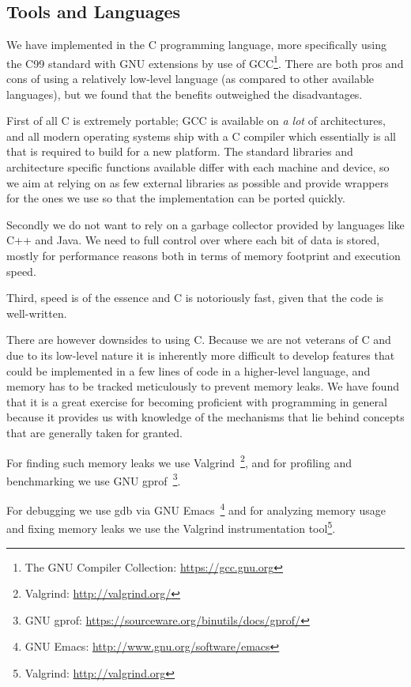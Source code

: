 \subsection{Tools and Languages}

We have implemented \thename{} in the C programming language, more specifically
using the C99 standard with GNU extensions by use of GCC\footnote{The GNU
  Compiler Collection: \url{https://gcc.gnu.org}}. There are both pros and cons
of using a relatively low-level language (as compared to other available
languages), but we found that the benefits outweighed the disadvantages.

First of all C is extremely portable; GCC is available on \textit{a lot} of
architectures, and all modern operating systems ship with a C compiler which
essentially is all that is required to build \thename{} for a new platform. The
standard libraries and architecture specific functions available differ with
each machine and device, so we aim at relying on as few external libraries as
possible and provide wrappers for the ones we use so that the implementation can
be ported quickly.

Secondly we do not want to rely on a garbage collector provided by languages
like C++ and Java. We need to full control over where each bit of data is
stored, mostly for performance reasons both in terms of memory footprint and
execution speed.

Third, speed is of the essence and C is notoriously fast, given that the code is
well-written.

There are however downsides to using C. Because we are not veterans of C and due
to its low-level nature it is inherently more difficult to develop features that
could be implemented in a few lines of code in a higher-level language, and
memory has to be tracked meticulously to prevent memory leaks. We have found
that it is a great exercise for becoming proficient with programming in general
because it provides us with knowledge of the mechanisms that lie behind concepts
that are generally taken for granted.

For finding such memory leaks we use Valgrind~\footnote{Valgrind:
  \url{http://valgrind.org/}}, and for profiling and benchmarking we use GNU
gprof~\footnote{GNU gprof: \url{https://sourceware.org/binutils/docs/gprof/}}.

For debugging we use gdb via GNU Emacs~\footnote{GNU Emacs:
  \url{http://www.gnu.org/software/emacs}} and for analyzing memory usage and
fixing memory leaks we use the Valgrind instrumentation tool\footnote{Valgrind:
  \url{http://valgrind.org}}.


